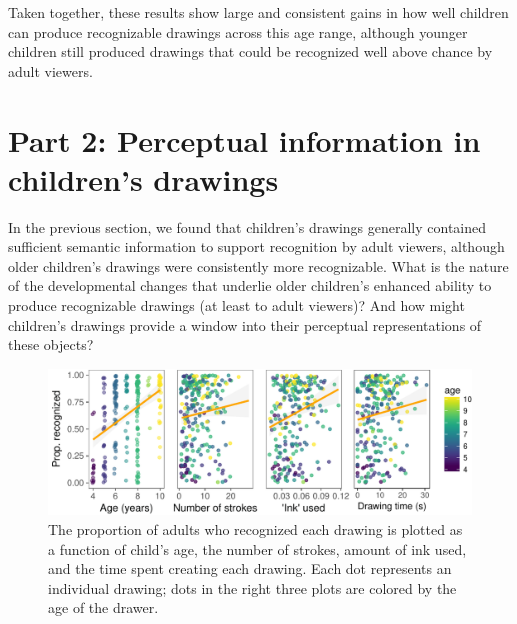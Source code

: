 \documentclass[10pt, letterpaper]{article}
\newenvironment{CodeChunk}{}{}
\begin{document}
Taken together, these results show large and consistent gains in how
well children can produce recognizable drawings across this age range,
although younger children still produced drawings that could be
recognized well above chance by adult viewers.

\section{Part 2: Perceptual information in children's
drawings}\label{part-2-perceptual-information-in-childrens-drawings}

In the previous section, we found that children's drawings generally
contained sufficient semantic information to support recognition by
adult viewers, although older children's drawings were consistently more
recognizable. What is the nature of the developmental changes that
underlie older children's enhanced ability to produce recognizable
drawings (at least to adult viewers)? And how might children's drawings
provide a window into their perceptual representations of these objects?

\begin{CodeChunk}
\begin{figure}[h]

{\centering \includegraphics{figs/covDescriptives-1} 

}

\caption[The proportion of adults who recognized each drawing is plotted as a function of child's age, the number of strokes, amount of ink used, and the time spent creating each drawing]{The proportion of adults who recognized each drawing is plotted as a function of child's age, the number of strokes, amount of ink used, and the time spent creating each drawing. Each dot represents an individual drawing; dots in the right three plots are colored by the age of the drawer.}\label{fig:covDescriptives}
\end{figure}
\end{CodeChunk}
\end{document}
